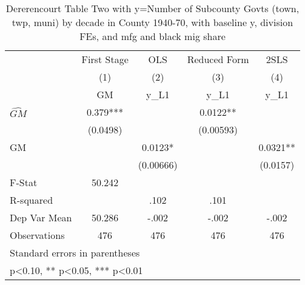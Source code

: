 \begin{table}[htbp]\centering
\def\sym#1{\ifmmode^{#1}\else\(^{#1}\)\fi}
\caption{Dererencourt Table Two with y=Number of Subcounty Govts (town, twp, muni) by decade in County 1940-70, with baseline y, division FEs, and mfg and black mig share}
\begin{tabular}{l*{4}{c}}
\toprule
                    & First Stage   &         OLS   &Reduced Form   &        2SLS   \\
                    &\multicolumn{1}{c}{(1)}&\multicolumn{1}{c}{(2)}&\multicolumn{1}{c}{(3)}&\multicolumn{1}{c}{(4)}\\
                    &\multicolumn{1}{c}{GM}&\multicolumn{1}{c}{y\_L1}&\multicolumn{1}{c}{y\_L1}&\multicolumn{1}{c}{y\_L1}\\
\midrule
$\hat{GM}$          &       0.379***&               &      0.0122** &               \\
                    &    (0.0498)   &               &   (0.00593)   &               \\
\addlinespace
GM                  &               &      0.0123*  &               &      0.0321** \\
                    &               &   (0.00666)   &               &    (0.0157)   \\
\midrule
F-Stat              &      50.242   &               &               &               \\
R-squared           &               &        .102   &        .101   &               \\
Dep Var Mean        &      50.286   &       -.002   &       -.002   &       -.002   \\
Observations        &         476   &         476   &         476   &         476   \\
\bottomrule
\multicolumn{5}{l}{\footnotesize Standard errors in parentheses}\\
\multicolumn{5}{l}{\footnotesize * p<0.10, ** p<0.05, *** p<0.01}\\
\end{tabular}
\end{table}
